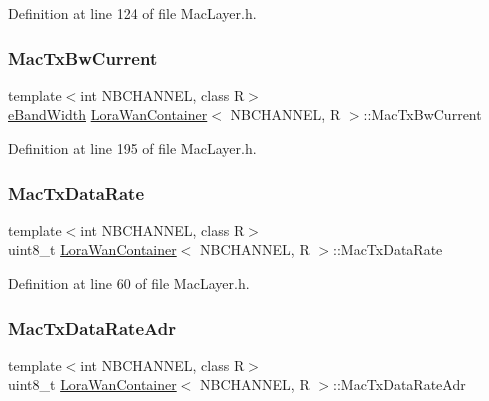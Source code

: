 Definition at line 124 of file Mac\+Layer.\+h.

\mbox{\label{class_lora_wan_container_a4b6a8445c09566ca796131333befeaa4}} 
\subsubsection{\texorpdfstring{Mac\+Tx\+Bw\+Current}{MacTxBwCurrent}}
{\footnotesize\ttfamily template$<$int N\+B\+C\+H\+A\+N\+N\+EL, class R$>$ \\
\mbox{\hyperlink{_define_8h_a6cbb491180e131f374cdbe63880c85e1}{e\+Band\+Width}} \mbox{\hyperlink{class_lora_wan_container}{Lora\+Wan\+Container}}$<$ N\+B\+C\+H\+A\+N\+N\+EL, R $>$\+::Mac\+Tx\+Bw\+Current\hspace{0.3cm}{\ttfamily [protected]}}



Definition at line 195 of file Mac\+Layer.\+h.

\mbox{\label{class_lora_wan_container_a4233437d7d4772f63973fafede72f4b5}} 
\subsubsection{\texorpdfstring{Mac\+Tx\+Data\+Rate}{MacTxDataRate}}
{\footnotesize\ttfamily template$<$int N\+B\+C\+H\+A\+N\+N\+EL, class R$>$ \\
uint8\+\_\+t \mbox{\hyperlink{class_lora_wan_container}{Lora\+Wan\+Container}}$<$ N\+B\+C\+H\+A\+N\+N\+EL, R $>$\+::Mac\+Tx\+Data\+Rate}



Definition at line 60 of file Mac\+Layer.\+h.

\mbox{\label{class_lora_wan_container_a90a66a8b7888673e0568c1202d1d3421}} 
\subsubsection{\texorpdfstring{Mac\+Tx\+Data\+Rate\+Adr}{MacTxDataRateAdr}}
{\footnotesize\ttfamily template$<$int N\+B\+C\+H\+A\+N\+N\+EL, class R$>$ \\
uint8\+\_\+t \mbox{\hyperlink{class_lora_wan_container}{Lora\+Wan\+Container}}$<$ N\+B\+C\+H\+A\+N\+N\+EL, R $>$\+::Mac\+Tx\+Data\+Rate\+Adr}



